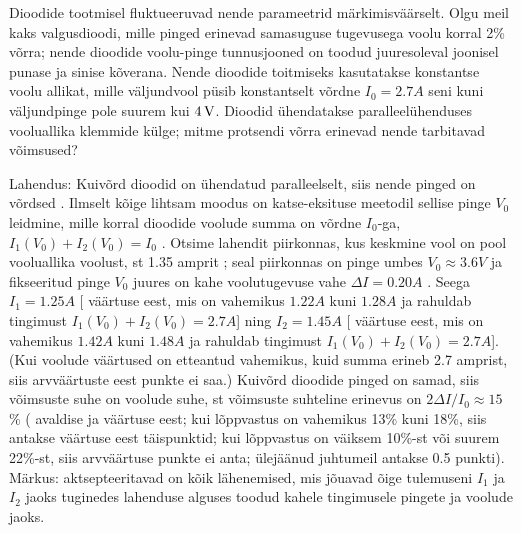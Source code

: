 \setAuthor{}

Dioodide tootmisel fluktueeruvad nende parameetrid märkimisväärselt. Olgu meil kaks valgusdioodi, mille pinged erinevad samasuguse tugevusega voolu korral 2\% võrra; nende dioodide voolu-pinge tunnusjooned on toodud juuresoleval joonisel punase ja sinise kõverana. Nende dioodide toitmiseks kasutatakse konstantse voolu allikat, mille väljundvool püsib konstantselt võrdne $I_0=\SI{2.7}A$ seni kuni väljundpinge pole suurem kui $\SI 4V$. Dioodid ühendatakse paralleelühenduses vooluallika klemmide külge; mitme protsendi võrra erinevad nende tarbitavad võimsused? 

\hint

\solu
Lahendus: Kuivõrd dioodid on ühendatud paralleelselt, siis nende pinged on võrdsed  . Ilmselt kõige lihtsam moodus on katse-eksituse meetodil sellise pinge $V_0$ leidmine, mille korral dioodide voolude summa on võrdne $I_0$-ga, $I_1(V_0)+I_2(V_0)=I_0$  . Otsime lahendit piirkonnas, kus keskmine vool on pool vooluallika voolust, st 1.35 amprit  ; seal piirkonnas on pinge umbes $V_0\approx \SI{3.6}V$  ja fikseeritud pinge $V_0$ juures on kahe voolutugevuse vahe $\Delta I = \SI {0.20}A$  . Seega $I_1=\SI{1.25}A$ [ väärtuse eest, mis on vahemikus $\SI{1.22}A$ kuni $\SI{1.28}A$  ja rahuldab tingimust $I_1(V_0)+I_2(V_0)=\SI{2.7}A$] ning $I_2=\SI{1.45}A$ [ väärtuse eest, mis on vahemikus $\SI{1.42}A$ kuni $\SI{1.48}A$ ja rahuldab tingimust $I_1(V_0)+I_2(V_0)=\SI{2.7}A$]. (Kui voolude väärtused on etteantud vahemikus, kuid summa erineb 2.7 amprist, siis arvväärtuste eest punkte ei saa.) Kuivõrd dioodide pinged on samad, siis võimsuste suhe on voolude suhe, st võimsuste suhteline erinevus on $2\Delta I/I_0\approx 15$\%  ( avaldise ja  väärtuse eest; kui lõppvastus on vahemikus 13\% kuni 18\%, siis antakse väärtuse eest täispunktid; kui lõppvastus on väiksem 10\%-st või suurem 22\%-st, siis arvväärtuse punkte ei anta; ülejäänud juhtumeil antakse 0.5 punkti). Märkus: aktsepteeritavad on kõik lähenemised, mis jõuavad õige tulemuseni $I_1$ ja $I_2$ jaoks tuginedes lahenduse alguses toodud kahele tingimusele pingete ja voolude jaoks.

\vspace{10pt}
\probend